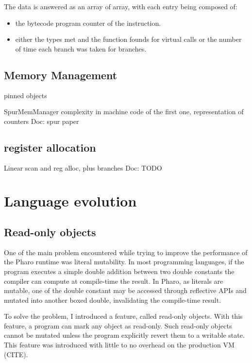 \documentclass[a4paper,12pt,twoside]{../includes/ThesisStyle}
\begin{document}
The data is answered as an array of array, with each entry being composed of:
\begin{itemize}
\item the bytecode program counter of the instruction.
\item either the types met and the function founds for virtual calls or the number of time each branch was taken for branches.
\end{itemize}


\subsection{Memory Management}

pinned objects

SpurMemManager complexity in machine code of the first one, representation of counters
Doc: spur paper

\subsection{register allocation}

Linear scan and reg alloc, plus branches
Doc: TODO


\section{Language evolution}

\subsection{Read-only objects}

One of the main problem encountered while trying to improve the performance of the Pharo runtime was literal mutability. In most programming languages, if the program executes a simple double addition between two double constants the compiler can compute at compile-time the result. In Pharo, as literals are mutable, one of the double constant may be accessed through reflective APIs and mutated into another boxed double, invalidating the compile-time result. 

To solve the problem, I introduced a feature, called read-only objects. With this feature, a program can mark any object as read-only. Such read-only objects cannot be mutated unless the program explicitly revert them to a writable state. This feature was introduced with little to no overhead on the production VM (CITE). 
\end{document}
